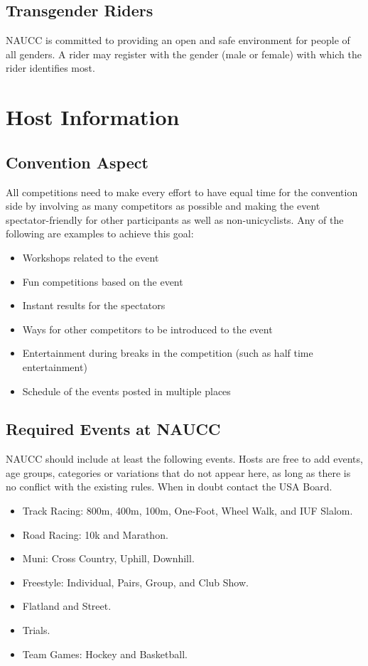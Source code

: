 \section{Transgender Riders}
NAUCC is committed to providing an open and safe environment for people of all genders.
A rider may register with the gender (male or female) with which the rider identifies most.

\chapter{Host Information}

\section{Convention Aspect}
All competitions need to make every effort to have equal time for the convention side by involving as many competitors as possible and making the event spectator-friendly for other participants as well as non-unicyclists.
Any of the following are examples to achieve this goal:
\begin{itemize}
  \item Workshops related to the event
  \item Fun competitions based on the event
  \item Instant results for the spectators
  \item Ways for other competitors to be introduced to the event
  \item Entertainment during breaks in the competition (such as half time entertainment)
  \item Schedule of the events posted in multiple places
\end{itemize}

\section{Required Events at NAUCC}
NAUCC should include at least the following events.
Hosts are free to add events, age groups, categories or variations that do not appear here, as long as there is no conflict with the existing rules.
When in doubt contact the USA Board.
\begin{itemize}
  \item Track Racing: 800m, 400m, 100m, One-Foot, Wheel Walk, and IUF Slalom.
  \item Road Racing: 10k and Marathon.
   \item Muni: Cross Country, Uphill, Downhill.
   \item Freestyle: Individual, Pairs, Group, and Club Show.
   \item Flatland and Street.
   \item Trials.
  \item Team Games: Hockey and Basketball.
\end{itemize}

